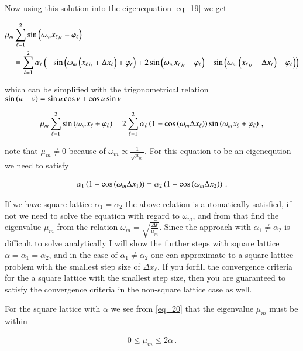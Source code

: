 \documentclass[11pt,english,a4paper]{article}
\begin{document}
\begin{flushleft}
Now using this solution into the eigenequation \eqref{eq_19} we get

\begin{align*}
&\mu_m \sum_{\ell=1}^2\sin\left({\omega_{m} x_{\ell j_\ell} + \varphi_\ell}\right)
\\
&\quad =
\sum_{\ell=1}^2 \alpha_\ell\left({-\sin\left({\omega_{m} \left({x_{\ell j_\ell}+\Delta x_\ell}\right) + \varphi_\ell}\right) + 2\sin\left({\omega_{m} x_{\ell j_\ell} + \varphi_\ell}\right) - \sin\left({\omega_{m} \left({x_{\ell j_\ell}-\Delta x_\ell}\right) + \varphi_\ell}\right)}\right)
\end{align*} 

which can be simplified with the trigonometrical relation $\sin\left({u+v}\right) = \sin u \cos v + \cos u \sin v$
 
\begin{align}
\mu_m\sum_{\ell=1}^2\sin\left({\omega_m x_\ell + \varphi_\ell}\right) = 2\sum_{\ell=1}^2 \alpha_\ell\left({1-\cos\left({\omega_{m} \Delta x_\ell}\right)}\right)\sin\left({\omega_m x_\ell + \varphi_\ell}\right) \,,
\label{eq_20}
\end{align}

note that $\mu_m\neq 0$ because of $\omega_{m} \propto \frac{1}{\sqrt{\mu_m}}$. For this equation to be an eigeneqution we need to satisfy

\begin{align*}
\alpha_1 \left({1-\cos\left({\omega_m \Delta x_1}\right)}\right) = \alpha_2\left({1-\cos\left({\omega_m \Delta x_2}\right)}\right)\,.
\end{align*}

If we have square lattice $\alpha_1 = \alpha_2$ the above relation is automatically satisfied, if not we need to solve the equation with regard to $\omega_m$, and from that find the eigenvalue $\mu_m$ from the relation $\omega_m = \sqrt{\frac{\Delta t}{\mu_m}}$. Since the approach with $\alpha_1 \neq \alpha_2$ is difficult to solve analytically I will show the further steps with square lattice $\alpha = \alpha_1 = \alpha_2$, and in the case of $\alpha_1 \neq \alpha_2$ one can approximate to a square lattice problem with the smallest step size of $\Delta x_\ell$. If you forfill the convergence criteria for the a square lattice with the smallest step size, then you are guaranteed to satisfy the convergence criteria in the non-square lattice case as well. \linebreak

For the square lattice with $\alpha$ we see from \eqref{eq_20} that the eigenvalue $\mu_m$ must be within

\begin{align*}
0 \leq \mu_m \leq 2\alpha \,.
\end{align*}



\end{flushleft}
\end{document}
